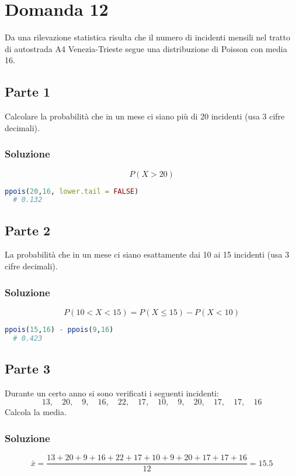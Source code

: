 \documentclass[a4paper]{article}
\theoremstyle{break}
\theoremstyle{break}
\theoremstyle{break}
\theoremstyle{break}
\begin{document}
\section{Domanda 12}
Da una rilevazione statistica risulta che il numero di incidenti
mensili nel tratto di autostrada A4 Venezia-Trieste segue una 
distribuzione di Poisson con media 16. 

\subsection{Parte 1}
Calcolare la probabilità che in un mese ci siano più di 20 incidenti
(usa 3 cifre decimali).

\subsubsection{Soluzione}
\[
P(X > 20)
\] 
\begin{lstlisting}[language=R]
  ppois(20,16, lower.tail = FALSE) 
  # 0.132
\end{lstlisting}

\subsection{Parte 2}
La probabilità che in un mese ci siano esattamente dai 10 ai
15 incidenti (usa 3 cifre decimali).

\subsubsection{Soluzione}
\[
P(10 < X < 15) = P(X \le 15) - P(X < 10)
\] 
\begin{lstlisting}[language=R]
  ppois(15,16) - ppois(9,16)
  # 0.423
\end{lstlisting}

\subsection{Parte 3}
Durante un certo anno si sono verificati i seguenti incidenti:
\[
13, \quad 20, \quad 9, \quad 16, \quad 22, \quad 17, \quad 10, \quad 9, \quad 20, \quad 17, \quad 17, \quad 16
\] 
Calcola la media.

\subsubsection{Soluzione}
\[
  \bar{x} = \frac{13 + 20 + 9 + 16 + 22 + 17 + 10 + 9 + 20 + 17 + 17 + 16}{12} = 15.5
\] 
\end{document}
